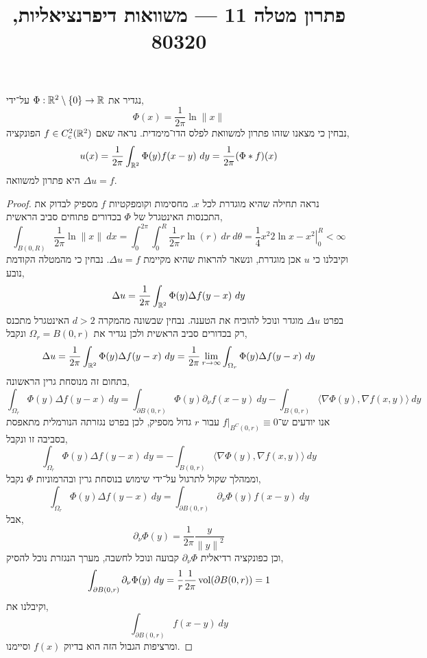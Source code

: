 
\title{פתרון מטלה 11 --- משוואות דיפרנציאליות, 80320}

\DeclareMathOperator\Div{div}

\usepackage{pgfplots, tikz, pgffor}
\usetikzlibrary{math}
\pgfplotsset{compat=1.18}


\maketitle
\maketitleprint[blue]{}

\question{}
נגדיר את $\Phi : \mathbb{R}^2 \setminus \{ 0 \} \to \mathbb{R}$ על־ידי,
\[
	\Phi(x)
	= \frac{1}{2 \pi} \ln \lVert x \rVert
\]
נבחין כי מצאנו שזהו פתרון למשוואת לפלס הדו־מימדית.
נראה שאם $f \in C_c^2(\mathbb{R}^2)$ הפונקציה,
\[
	u(x)
	= \frac{1}{2 \pi} \int_{\mathbb{R}^2} \Phi(y) f(x - y)\ dy
	= \frac{1}{2 \pi} (\Phi * f)(x)
\]
היא פתרון למשוואה $\Delta u = f$.
\begin{proof}
	נראה תחילה שהיא מוגדרת לכל $x$.
	מחסימות וקומפקטיות $f$ מספיק לבדוק את התכנסות האינטגרל של $\Phi$ בכדורים פתוחים סביב הראשית,
	\[
		\int_{B(0, R)} \frac{1}{2 \pi} \ln \lVert x \rVert\ dx
		= \int_0^{2 \pi} \int_0^R \frac{1}{2 \pi} r \ln(r)\ dr\ d \theta
		= \frac{1}{4} \left. x^2 2 \ln x - x^2 \right\rvert_0^R
		< \infty
	\]
	וקיבלנו כי $u$ אכן מוגדרת, ונשאר להראות שהיא מקיימת $\Delta u = f$.
	נבחין כי מהמטלה הקודמת נובע,
	\[
		\Delta u
		= \frac{1}{2 \pi} \int_{\RR^2} \Phi(y) \Delta f(y - x)\ dy
	\]
	בפרט $\Delta u$ מוגדר ונוכל להוכיח את הטענה.
	נבחין שבשונה מהמקרה $d > 2$ האינטגרל מתכנס רק בכדורים סביב הראשית ולכן נגדיר את $\Omega_r = B(0, r)$ ונקבל,
	\[
		\Delta u
		= \frac{1}{2 \pi} \int_{\mathbb{R}^2} \Phi(y) \Delta f(y - x)\ dy
		= \frac{1}{2 \pi} \lim_{r \to \infty} \int_{\Omega_r} \Phi(y) \Delta f(y - x)\ dy
	\]
	בתחום זה מנוסחת גרין הראשונה,
	\[
		\int_{\Omega_r} \Phi(y) \Delta f(y - x)\ dy
		= \int_{\partial B(0, r)} \Phi(y) \partial_{\nu} f(x - y)\ dy - \int_{B(0, r)} \langle \nabla \Phi(y), \nabla f(x, y) \rangle\ dy
	\]
	אנו יודעים ש־$f |_{B^C(0, r)} \equiv 0$ עבור $r$ גדול מספיק, לכן בפרט נגזרתה הנורמלית מתאפסת בסביבה זו ונקבל,
	\[
		\int_{\Omega_r} \Phi(y) \Delta f(y - x)\ dy
		= - \int_{B(0, r)} \langle \nabla \Phi(y), \nabla f(x, y) \rangle\ dy
	\]
	וממהלך שקול לתרגול על־ידי שימוש בנוסחת גרין ובהרמוניות $\Phi$ נקבל,
	\[
		\int_{\Omega_r} \Phi(y) \Delta f(y - x)\ dy
		= \int_{\partial B(0, r)} \partial_{\nu} \Phi(y) f(x - y)\ dy
	\]
	אבל,
	\[
		\partial_{\nu} \Phi(y)
		= \frac{1}{2 \pi} \frac{y}{{\lVert y \rVert}^2}
	\]
	וכן כפונקציה רדיאלית $\partial_{\nu} \Phi$ קבועה ונוכל לחשבה, מערך הנגזרת נוכל להסיק,
	\[
		\int_{\partial B(0, r)} \partial_{\nu} \Phi(y)\ dy
		= \frac{1}{r} \frac{1}{2 \pi} \vol(\partial B(0, r))
		= 1
	\]
	וקיבלנו את,
	\[
		\int_{\partial B(0, r)} f(x - y)\ dy
	\]
	ומרציפות הגבול הזה הוא בדיוק $f(x)$ וסיימנו.
\end{proof}

